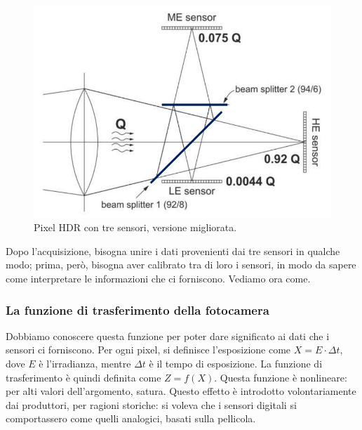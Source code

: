 \documentclass[a4paper,11pt]{article}
\begin{document}
\renewcommand{\thefigure}{3.16}
\begin{figure}[!h]
  \centering
    \includegraphics[scale=0.4]{images/3/trisensor_beam.png}
    \caption{Pixel HDR con tre sensori, versione migliorata.}
\end{figure}

Dopo l'acquisizione, bisogna unire i dati provenienti dai tre sensori in qualche modo; prima, però, bisogna aver calibrato tra di loro i sensori, in modo da sapere come interpretare
le informazioni che ci forniscono. Vediamo ora come.

\subsubsection{La funzione di trasferimento della fotocamera}
Dobbiamo conoscere questa funzione per poter dare significato ai dati che i sensori ci forniscono.
Per ogni pixel, si definisce l'esposizione come $X = E \cdot \Delta t$, dove $E$ è l'irradianza, mentre $\Delta t$
è il tempo di esposizione. La funzione di trasferimento è quindi definita come $Z = f(X)$. Questa
funzione è nonlineare: per alti valori dell'argomento, satura. Questo effetto è introdotto volontariamente dai produttori,
per ragioni storiche: si voleva che i sensori digitali si comportassero come quelli analogici, basati sulla pellicola.
\end{document}
